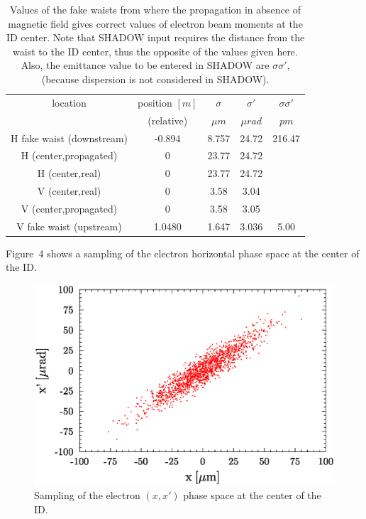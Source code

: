 \documentclass[a4paper,10pt]{article}
\begin{document}
\begin{table}[H]
\label{tablefakewaist}
\caption{Values of the fake waists from where the propagation in absence of magnetic field gives correct values of electron beam 
moments at the ID center. 
Note that SHADOW input requires the distance from the waist to the ID center, thus the opposite
of the values given here. Also, the emittance value to be entered in SHADOW are $\sigma \sigma' $, (because dispersion is not considered in SHADOW). } 
\vspace{0.3cm}
\begin{tabular}{ccccc}
\hline
location                 & position   $[m]$ &  $\sigma$   & $\sigma'$ & $\sigma \sigma'$\\
                         & (relative)       &  $\mu m$    & $\mu rad$ &     $pm$        \\
\hline
H fake waist (downstream)&  -0.894         &  8.757      & 24.72     & 216.47      \\
H (center,propagated)    &   0             &  23.77      & 24.72     &             \\
H (center,real)          &   0             &  23.77      & 24.72     &             \\
\hline
V (center,real)          &   0             &  3.58       & 3.04      &             \\
V (center,propagated)    &   0             &  3.58       & 3.05      &             \\
V fake waist (upstream)  &  1.0480         &  1.647      & 3.036     & 5.00        \\
\hline 
\end{tabular}
\end{table}
% 

Figure~4
shows a sampling of the electron horizontal phase space at the center of the ID. 

\begin{figure}[H]
\label{figscatter}
\centering
\includegraphics[keepaspectratio,width=5in]{GRAPHICS/scatter.eps}
\caption{Sampling of the electron  $(x,x')$ phase space at the center of the ID. }
\end{figure}
\end{document}
